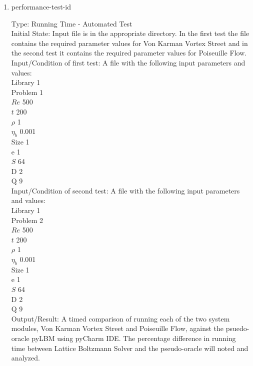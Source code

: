 \documentclass[12pt, titlepage]{article}
\newcommand{\famname}{Lattice Boltzmann Solver}
\newcounter{testcounter} %
\begin{document}
\begin{enumerate}

\item{performance-test-id\thetestcounter \\}

Type: Running Time - Automated Test\\
					
Initial State: Input file is in the appropriate directory. In the first test the file contains the required parameter values for Von Karman Vortex Street and in the second test it contains the required parameter values for Poiseuille Flow.\\
					
Input/Condition of first test: A file with the following input parameters and values:\\
Library 1\\
Problem 1\\
$Re$ 500\\
$t$ 200\\
$\rho$ 1\\
$\eta_b$ 0.001\\
Size 1\\
$\mathrm{e}$ 1\\
$S$ 64\\
$\mathrm{D}$ 2\\
$\mathrm{Q}$ 9\\

Input/Condition of second test: A file with the following input parameters and values:\\
Library 1\\
Problem 2\\
$Re$ 500\\
$t$ 200\\
$\rho$ 1\\
$\eta_b$ 0.001\\
Size 1\\
$\mathrm{e}$ 1\\
$S$ 64\\
$\mathrm{D}$ 2\\
$\mathrm{Q}$ 9\\
					
Output/Result: A timed comparison of running
each of the two system modules, Von Karman Vortex Street and Poiseuille Flow,
against the psuedo-oracle pyLBM using pyCharm IDE. The percentage difference in
running time between {\famname} and the pseudo-oracle will noted and analyzed.\\


\end{enumerate}
\end{document}
